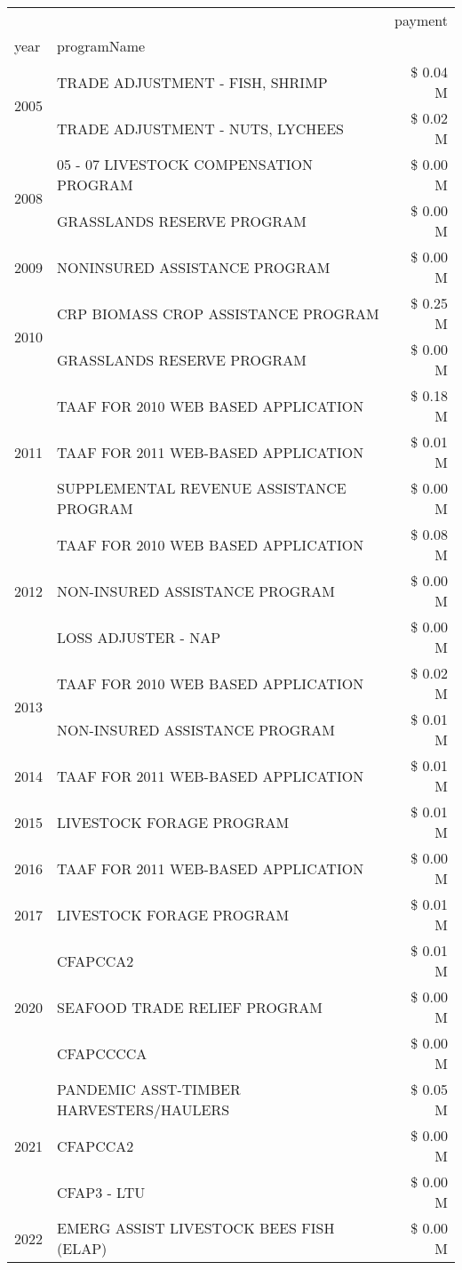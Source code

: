 \begin{tabular}{llr}
\toprule
 &  & payment \\
year & programName &  \\
\midrule
\multirow[t]{2}{*}{2005} & TRADE ADJUSTMENT - FISH, SHRIMP & \$ 0.04 M \\
 & TRADE ADJUSTMENT - NUTS, LYCHEES & \$ 0.02 M \\
\cline{1-3}
\multirow[t]{2}{*}{2008} & 05 - 07 LIVESTOCK COMPENSATION PROGRAM & \$ 0.00 M \\
 & GRASSLANDS RESERVE PROGRAM & \$ 0.00 M \\
\cline{1-3}
2009 & NONINSURED ASSISTANCE PROGRAM & \$ 0.00 M \\
\cline{1-3}
\multirow[t]{2}{*}{2010} & CRP BIOMASS CROP ASSISTANCE PROGRAM & \$ 0.25 M \\
 & GRASSLANDS RESERVE PROGRAM & \$ 0.00 M \\
\cline{1-3}
\multirow[t]{3}{*}{2011} & TAAF FOR 2010 WEB BASED APPLICATION & \$ 0.18 M \\
 & TAAF FOR 2011 WEB-BASED APPLICATION & \$ 0.01 M \\
 & SUPPLEMENTAL REVENUE ASSISTANCE PROGRAM & \$ 0.00 M \\
\cline{1-3}
\multirow[t]{3}{*}{2012} & TAAF FOR 2010 WEB BASED APPLICATION & \$ 0.08 M \\
 & NON-INSURED ASSISTANCE PROGRAM & \$ 0.00 M \\
 & LOSS ADJUSTER - NAP & \$ 0.00 M \\
\cline{1-3}
\multirow[t]{2}{*}{2013} & TAAF FOR 2010 WEB BASED APPLICATION & \$ 0.02 M \\
 & NON-INSURED ASSISTANCE PROGRAM & \$ 0.01 M \\
\cline{1-3}
2014 & TAAF FOR 2011 WEB-BASED APPLICATION & \$ 0.01 M \\
\cline{1-3}
2015 & LIVESTOCK FORAGE PROGRAM & \$ 0.01 M \\
\cline{1-3}
2016 & TAAF FOR 2011 WEB-BASED APPLICATION & \$ 0.00 M \\
\cline{1-3}
2017 & LIVESTOCK FORAGE PROGRAM & \$ 0.01 M \\
\cline{1-3}
\multirow[t]{3}{*}{2020} & CFAPCCA2 & \$ 0.01 M \\
 & SEAFOOD TRADE RELIEF PROGRAM & \$ 0.00 M \\
 & CFAPCCCCA & \$ 0.00 M \\
\cline{1-3}
\multirow[t]{3}{*}{2021} & PANDEMIC ASST-TIMBER HARVESTERS/HAULERS & \$ 0.05 M \\
 & CFAPCCA2 & \$ 0.00 M \\
 & CFAP3 - LTU & \$ 0.00 M \\
\cline{1-3}
2022 & EMERG ASSIST LIVESTOCK BEES FISH (ELAP) & \$ 0.00 M \\
\cline{1-3}
\bottomrule
\end{tabular}
